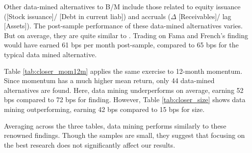 Other data-mined alternatives to B/M include those related to equity issuance ([Stock issuance]/ [Debt in current liab]) and accruals ($\Delta$ [Receivables]/ lag [Assets]). The post-sample performance of these data-mined alternatives varies. But on average, they are quite similar to \citet{fama1992cross}. Trading on Fama and French's finding would have earned 61 bps per month post-sample, compared to 65 bps for the typical data mined alternative.

Table \ref{tab:closer_mom12m} applies the same exercise to  12-month momentum. Since momentum has a much higher mean return, only 44 data-mined alternatives are found. Here, data mining underperforms on average, earning 52 bps compared to 72 bps for  finding. However, Table \ref{tab:closer_size} shows data mining outperforming, earning 42 bps compared to 15 bps for  size.

Averaging across the three tables, data mining performs similarly to these renowned findings. Though the samples are small, they suggest that focusing on the best research does not significantly affect our results.  